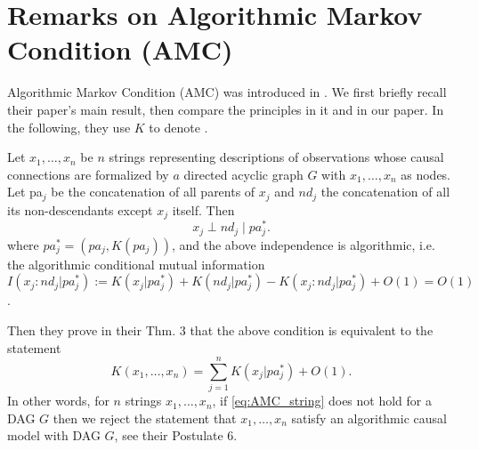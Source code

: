\section{Remarks on Algorithmic Markov Condition (AMC)}\label{sec:remark_AMC}
Algorithmic Markov Condition (AMC) was introduced in \cite{janzing2010causal}. We first briefly recall their paper's main result, then compare the principles in it and in our paper. In the following, they use $K$ to denote  \citep[Chapter 3]{li2019introduction}.
\begin{definition}\citep[Postulate 5]{janzing2010causal}\label{def:AMC}
Let $x_1,\ldots,x_n$ be $n$ strings representing descriptions of observations whose causal connections are formalized by $a$ directed acyclic graph $G$ with $x_1,\ldots,x_n$ as nodes. Let pa$_j$ be the concatenation of all parents of $x_j$ and $nd_j$ the concatenation of all its non-descendants except $x_j$ itself. Then
$$x_j\perp nd_j\mid pa_j^*.$$
where $pa_j^*=(pa_j, K(pa_j))$, and the above independence is algorithmic, i.e. the algorithmic conditional mutual information $I(x_j:nd_j|pa_j^*):=K(x_j|pa_j^*)+K(nd_j|pa_j^*)-K(x_j:nd_j|pa_j^*)+O(1) =O(1)$.
\end{definition}

Then they prove in their Thm. 3 that the above condition is equivalent to the statement 
\begin{equation}\label{eq:AMC_string}
    K(x_1,\dots, x_n)=\sum_{j=1}^n K(x_j|pa_j^*) +O(1).
\end{equation}
In other words, for $n$ strings $x_1, \dots, x_n$, if \cref{eq:AMC_string} does not hold for a DAG $G$ then we reject the statement that $x_1, \dots, x_n$ satisfy an algorithmic causal model with DAG $G$, see their Postulate 6.

